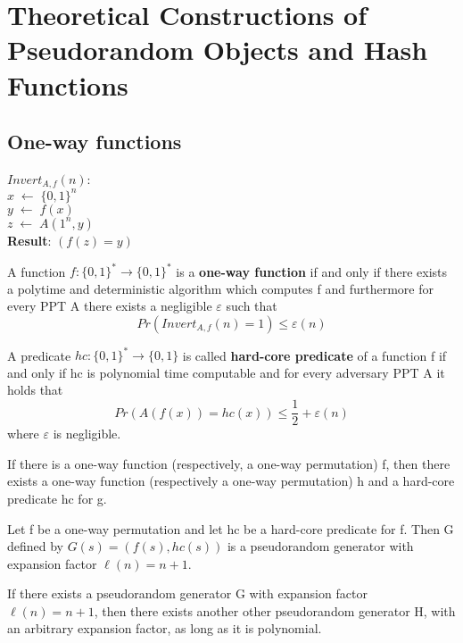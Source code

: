 \documentclass[../main]{subfiles}
\begin{document}
\chapter{Theoretical Constructions of Pseudorandom Objects
and Hash Functions}

\section{One-way functions}

$Invert_{A, f}(n)$:\\
$x \; \leftarrow{} \; \{0, 1\}^n$\\
$y\; \leftarrow{} \; f(x)$\\
$z \; \leftarrow{} \; A(1^n, y)$\\
\textbf{Result}: $(f(z)=y)$

\begin{definition}
    A function $f:\{0, 1\}^* \rightarrow \{0, 1\}^*$ is a \textbf{one-way function} if and only if there exists a polytime and deterministic algorithm which computes f and furthermore for every PPT A there exists a negligible $\varepsilon$ such that
    $$Pr(Invert_{A, f}(n)=1) \leq \varepsilon(n)$$
\end{definition}

\begin{definition}
    A predicate $hc:\{0, 1\}^* \rightarrow \{0, 1\}$ is called \textbf{hard-core predicate} of a function f if and only if hc is polynomial time computable and for every adversary PPT A it holds that
    $$Pr(A(f(x))=hc(x)) \leq \frac{1}{2} + \varepsilon(n) $$
    where $\varepsilon$ is negligible.
\end{definition}

\begin{theorem}
    If there is a one-way function (respectively, a one-way permutation) f, then there exists a one-way function (respectively a one-way permutation) h and a hard-core predicate hc for g.
\end{theorem}

\begin{theorem}
    Let f be a one-way permutation and let hc be a hard-core predicate for f.
    Then G defined by $G(s) = (f(s), hc(s))$ is a pseudorandom generator with expansion factor $\ell(n) = n+1$.
\end{theorem}

\begin{theorem}
    If there exists a pseudorandom generator G with expansion factor $\ell(n) = n+1$, then there exists another other pseudorandom generator H, with an arbitrary expansion factor, as long as it is polynomial.
\end{theorem}
\end{document}
